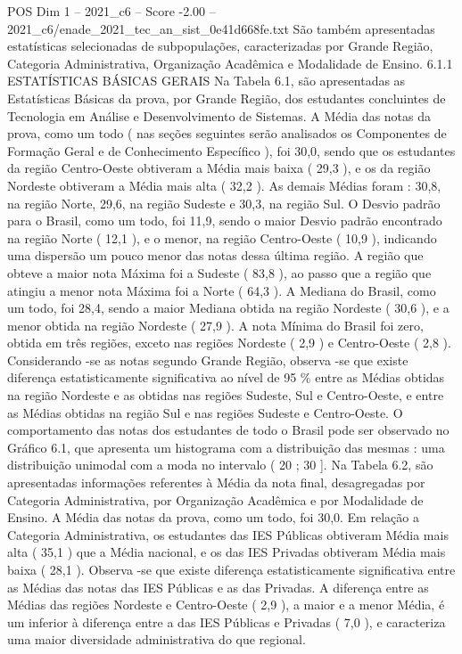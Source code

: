 \begin{textsample}{POS Dim 1 – 2021\_c6 – Score -2.00 – 2021\_c6/enade\_2021\_tec\_an\_sist\_0e41d668fe.txt}
São também apresentadas estatísticas selecionadas de subpopulações, caracterizadas por Grande Região, Categoria Administrativa, Organização Acadêmica e Modalidade de Ensino. 6.1.1 ESTATÍSTICAS BÁSICAS GERAIS Na Tabela 6.1, são apresentadas as Estatísticas Básicas da prova, por Grande Região, dos estudantes concluintes de Tecnologia em Análise e Desenvolvimento de Sistemas.
A Média das notas da prova, como um todo ( nas seções seguintes serão analisados os Componentes de Formação Geral e de Conhecimento Específico ), foi 30,0, sendo que os estudantes da região Centro-Oeste obtiveram a Média mais baixa ( 29,3 ), e os da região Nordeste obtiveram a Média mais alta ( 32,2 ).
As demais Médias foram : 30,8, na região Norte, 29,6, na região Sudeste e 30,3, na região Sul.
O Desvio padrão para o Brasil, como um todo, foi 11,9, sendo o maior Desvio padrão encontrado na região Norte ( 12,1 ), e o menor, na região Centro-Oeste ( 10,9 ), indicando uma dispersão um pouco menor das notas dessa última região.
A região que obteve a maior nota Máxima foi a Sudeste ( 83,8 ), ao passo que a região que atingiu a menor nota Máxima foi a Norte ( 64,3 ).
A Mediana do Brasil, como um todo, foi 28,4, sendo a maior Mediana obtida na região Nordeste ( 30,6 ), e a menor obtida na região Nordeste ( 27,9 ).
A nota Mínima do Brasil foi zero, obtida em três regiões, exceto nas regiões Nordeste ( 2,9 ) e Centro-Oeste ( 2,8 ).
Considerando -se as notas segundo Grande Região, observa -se que existe diferença estatisticamente significativa ao nível de 95 \% entre as Médias obtidas na região Nordeste e as obtidas nas regiões Sudeste, Sul e Centro-Oeste, e entre as Médias obtidas na região Sul e nas regiões Sudeste e Centro-Oeste.
O comportamento das notas dos estudantes de todo o Brasil pode ser observado no Gráfico 6.1, que apresenta um histograma com a distribuição das mesmas : uma distribuição unimodal com a moda no intervalo ( 20 ; 30 ].
Na Tabela 6.2, são apresentadas informações referentes à Média da nota final, desagregadas por Categoria Administrativa, por Organização Acadêmica e por Modalidade de Ensino.
A Média das notas da prova, como um todo, foi 30,0.
Em relação a Categoria Administrativa, os estudantes das IES Públicas obtiveram Média mais alta ( 35,1 ) que a Média nacional, e os das IES Privadas obtiveram Média mais baixa ( 28,1 ).
Observa -se que existe diferença estatisticamente significativa entre as Médias das notas das IES Públicas e as das Privadas.
A diferença entre as Médias das regiões Nordeste e Centro-Oeste ( 2,9 ), a maior e a menor Média, é um inferior à diferença entre a das IES Públicas e Privadas ( 7,0 ), e caracteriza uma maior diversidade administrativa do que regional.

\end{textsample}
